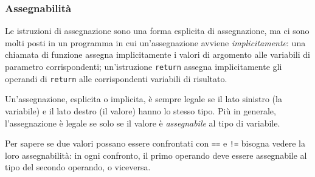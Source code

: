 \documentclass[../../../thesis.tex]{subfiles}
\begin{document}
    \subsubsection{Assegnabilità}
    Le istruzioni di assegnazione sono una forma esplicita di assegnazione, ma ci sono molti posti in un programma in cui un'assegnazione avviene \textit{implicitamente}: una chiamata di funzione assegna implicitamente i valori di argomento alle variabili di parametro corrispondenti;
    un'istruzione \verb"return" assegna implicitamente gli operandi di \verb"return" alle corrispondenti variabili di risultato.
    \hfill \vspace{12pt}

    Un'assegnazione, esplicita o implicita, è sempre legale se il lato sinistro (la variabile) e il lato destro (il valore) hanno lo stesso tipo.
    Più in generale, l'assegnazione è legale se solo se il valore è \textit{assegnabile} al tipo di variabile.
    \hfill \vspace{12pt}

    Per sapere se due valori possano essere confrontati con \verb"==" e \verb"!=" bisogna vedere la loro assegnabilità: in ogni confronto, il primo operando deve essere assegnabile al tipo del secondo operando, o viceversa.
\end{document}
